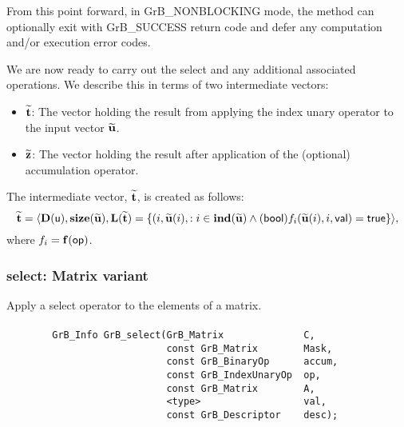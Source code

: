 From this point forward, in {\sf GrB\_NONBLOCKING} mode, the method can 
optionally exit with {\sf GrB\_SUCCESS} return code and defer any computation 
and/or execution error codes.

We are now ready to carry out the {\sf select} and any additional 
associated operations.  We describe this in terms of two intermediate vectors:
\begin{itemize}
    \item ${\bf \widetilde{t}}$: The vector holding the result from applying the index unary operator to the input vector
    ${\bf \widetilde{u}}$.
    \item ${\bf \widetilde{z}}$: The vector holding the result after 
    application of the (optional) accumulation operator.
\end{itemize}

{\color{red}
The intermediate vector, ${\bf \widetilde{t}}$, is created as follows:
\[
{\bf \widetilde{t}} = \langle
\bold{D}({\sf u}), \bold{size}({\bf \widetilde{u}}),
\bold{L}({\bf \widetilde{t}}) =
\{(i,{\bf \widetilde{u}}(i), : i \in \bold{ind}({\bf \widetilde{u}}) \wedge ({\sf bool})f_i({\bf \widetilde{u}}(i),i,{\sf val}) = {\sf true} \} \rangle,
\]
where $f_{i} = \mathbf{f}({\sf op})$. 
}






\subsubsection{{\sf select}: Matrix variant}

Apply a select operator to the elements of a matrix.

\paragraph{\syntax}

\begin{verbatim}
        GrB_Info GrB_select(GrB_Matrix              C,
                            const GrB_Matrix        Mask,
                            const GrB_BinaryOp      accum,
                            const GrB_IndexUnaryOp  op,
                            const GrB_Matrix        A,
                            <type>                  val,
                            const GrB_Descriptor    desc);
\end{verbatim}

